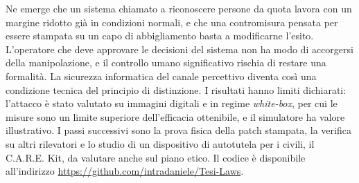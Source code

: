 \documentclass[a4paper,12pt]{report}
\begin{document}
Ne emerge che un sistema chiamato a riconoscere persone da quota lavora con un
margine ridotto già in condizioni normali, e che una contromisura pensata per
essere stampata su un capo di abbigliamento basta a modificarne l'esito.
L'operatore che deve approvare le decisioni del sistema non ha modo di
accorgersi della manipolazione, e il controllo umano significativo rischia di
restare una formalità. La sicurezza informatica del canale percettivo diventa
così una condizione tecnica del principio di distinzione. I risultati hanno
limiti dichiarati: l'attacco è stato valutato su immagini digitali e in regime
\emph{white-box}, per cui le misure sono un limite superiore dell'efficacia
ottenibile, e il simulatore ha valore illustrativo. I passi successivi sono la
prova fisica della patch stampata, la verifica su altri rilevatori e lo studio
di un dispositivo di autotutela per i civili, il C.A.R.E. Kit, da valutare
anche sul piano etico. Il codice è disponibile all'indirizzo
\url{https://github.com/intradaniele/Tesi-Laws}.
\end{document}
